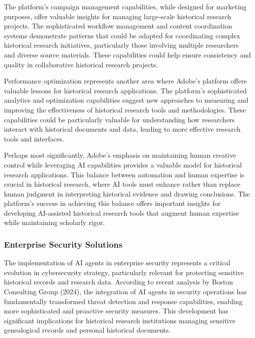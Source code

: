 \documentclass[
]{article}
\begin{document}
The platform's campaign management capabilities, while designed for
marketing purposes, offer valuable insights for managing large-scale
historical research projects. The sophisticated workflow management and
content coordination systems demonstrate patterns that could be adapted
for coordinating complex historical research initiatives, particularly
those involving multiple researchers and diverse source materials. These
capabilities could help ensure consistency and quality in collaborative
historical research projects.

Performance optimization represents another area where Adobe's platform
offers valuable lessons for historical research applications. The
platform's sophisticated analytics and optimization capabilities suggest
new approaches to measuring and improving the effectiveness of
historical research tools and methodologies. These capabilities could be
particularly valuable for understanding how researchers interact with
historical documents and data, leading to more effective research tools
and interfaces.

Perhaps most significantly, Adobe's emphasis on maintaining human
creative control while leveraging AI capabilities provides a valuable
model for historical research applications. This balance between
automation and human expertise is crucial in historical research, where
AI tools must enhance rather than replace human judgment in interpreting
historical evidence and drawing conclusions. The platform's success in
achieving this balance offers important insights for developing
AI-assisted historical research tools that augment human expertise while
maintaining scholarly rigor.

\subsubsection{Enterprise Security
Solutions}\label{enterprise-security-solutions}

The implementation of AI agents in enterprise security represents a
critical evolution in cybersecurity strategy, particularly relevant for
protecting sensitive historical records and research data. According to
recent analysis by Boston Consulting Group (2024), the integration of AI
agents in security operations has fundamentally transformed threat
detection and response capabilities, enabling more sophisticated and
proactive security measures. This development has significant
implications for historical research institutions managing sensitive
genealogical records and personal historical documents.
\end{document}
